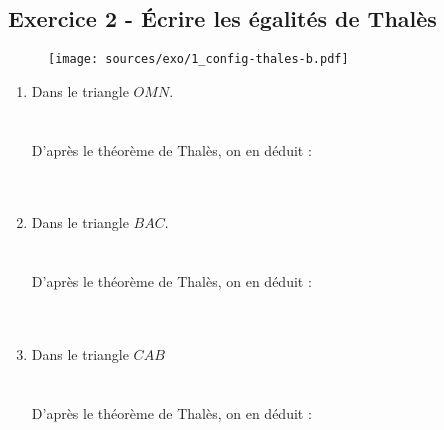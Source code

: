 \documentclass[12pt]{article}
\begin{document}
\subsection*{Exercice 2 - Écrire les égalités de Thalès}

\begin{figure}[H]
  \centering
  \texttt{[image: sources/exo/1\_config-thales-b.pdf]}
\end{figure}

\begin{multicols}{3}
  \begin{enumerate}
  \item Dans le triangle $OMN$.\\ 
  \phantom{abc}\\
  \phantom{abc}\\
  D'après le théorème de Thalès, on en déduit :\\
   \phantom{abc}\\
  \phantom{abc}\\
  \item Dans le triangle $BAC$.\\ 
  \phantom{abc}\\
  \phantom{abc}\\
  D'après le théorème de Thalès, on en déduit :\\
  \phantom{abc}\\
  \phantom{abc}\\
  \item Dans le triangle $CAB$\\
  \phantom{abc}\\
  \phantom{abc}\\
  D'après le théorème de Thalès, on en déduit :\\
  \phantom{abc}\\
  \phantom{abc}\\
  \end{enumerate}
\end{multicols}

\vspace{0.3cm}
\noindent\hrulefill
\end{document}
